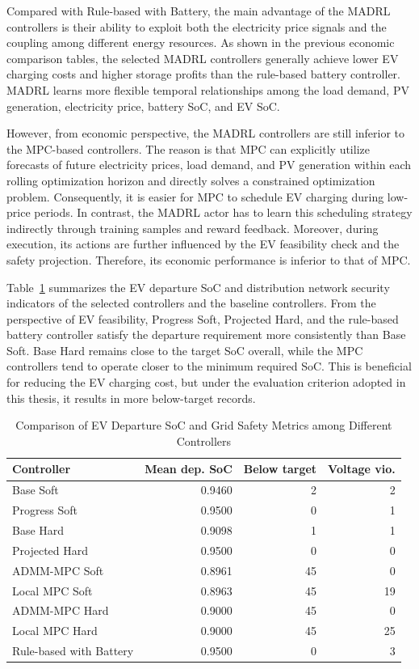 Compared with Rule-based with Battery, the main advantage of the MADRL controllers is their ability to exploit both the electricity price signals and the coupling among different energy resources. As shown in the previous economic comparison tables, the selected MADRL controllers generally achieve lower EV charging costs and higher storage profits than the rule-based battery controller. MADRL learns more flexible temporal relationships among the load demand, PV generation, electricity price, battery SoC, and EV SoC.

However, from economic perspective, the MADRL controllers are still inferior to the MPC-based controllers. The reason is that MPC can explicitly utilize forecasts of future electricity prices, load demand, and PV generation within each rolling optimization horizon and directly solves a constrained optimization problem. Consequently, it is easier for MPC to schedule EV charging during low-price periods. In contrast, the MADRL actor has to learn this scheduling strategy indirectly through training samples and reward feedback. Moreover, during execution, its actions are further influenced by the EV feasibility check and the safety projection. Therefore, its economic performance is inferior to that of MPC.

Table~\ref{tab:ch6-best-ev-grid-summary} summarizes the EV departure SoC and distribution network security indicators of the selected controllers and the baseline controllers. From the perspective of EV feasibility, Progress Soft, Projected Hard, and the rule-based battery controller satisfy the departure requirement more consistently than Base Soft. Base Hard remains close to the target SoC overall, while the MPC controllers tend to operate closer to the minimum required SoC. This is beneficial for reducing the EV charging cost, but under the evaluation criterion adopted in this thesis, it results in more below-target records.

\begin{table}[htbp]
  \centering
  \caption{Comparison of EV Departure SoC and Grid Safety Metrics among Different Controllers}
  \label{tab:ch6-best-ev-grid-summary}
  \begin{tabular}{lrrr}
    \toprule
    Controller & Mean dep. SoC & Below target & Voltage vio. \\
    \midrule
    Base Soft & 0.9460 & 2 & 2 \\
    Progress Soft & 0.9500 & 0 & 1 \\
    Base Hard & 0.9098 & 1 & 1 \\
    Projected Hard & 0.9500 & 0 & 0 \\
    ADMM-MPC Soft & 0.8961 & 45 & 0 \\
    Local MPC Soft & 0.8963 & 45 & 19 \\
    ADMM-MPC Hard & 0.9000 & 45 & 0 \\
    Local MPC Hard & 0.9000 & 45 & 25 \\
    Rule-based with Battery & 0.9500 & 0 & 3 \\
    \bottomrule
  \end{tabular}
\end{table}

